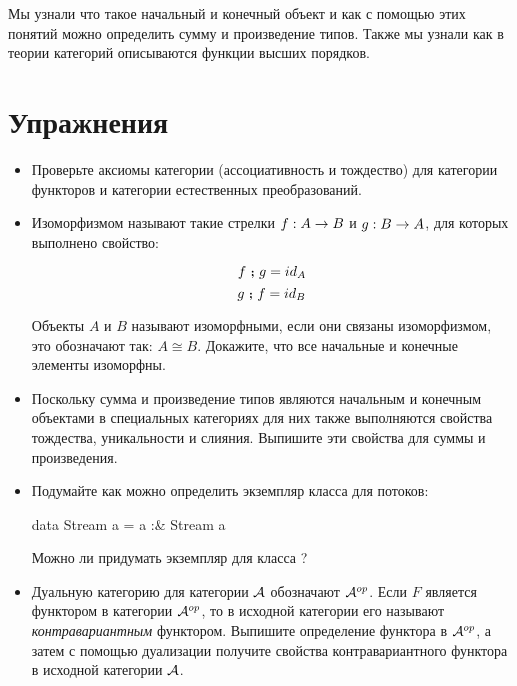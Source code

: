 Мы узнали что такое начальный и конечный объект и как
с помощью этих понятий можно определить сумму и произведение
типов. Также мы узнали как в теории категорий описываются
функции высших порядков.

\section{Упражнения}


\begin{itemize}
\item Проверьте аксиомы категории (ассоциативность и тождество)
    для категории функторов и категории естественных преобразований.

\item Изоморфизмом называют такие стрелки $f:A \rightarrow B$ и $g : B \rightarrow A$, для 
    которых выполнено свойство:

    \[ f \footnotesize\textbf{~;~}\normalsize g = id_A \]
    \[ g \footnotesize\textbf{~;~}\normalsize f = id_B \]

    Объекты $A$ и $B$ называют изоморфными, если они связаны
    изоморфизмом, это обозначают так: $A \cong B$. 
    Докажите, что все начальные и конечные элементы 
    изоморфны. 

\item Поскольку сумма и произведение типов являются 
    начальным и конечным объектами в специальных категориях
    для них также выполняются свойства тождества, уникальности и слияния.
    Выпишите эти свойства для суммы и произведения. 

\item Подумайте как можно определить экземпляр класса 
    для потоков:

\begin{code}
data Stream a = a :& Stream a
\end{code}

    Можно ли придумать экземпляр для класса ?

\item Дуальную категорию для категории $\mathcal{A}$ обозначают $\mathcal{A}^{op}$.
    Если $F$ является функтором в категории $\mathcal{A}^{op}$, то
    в исходной категории его называют \emph{контравариантным}
    функтором. Выпишите определение функтора в $\mathcal{A}^{op}$,
    а затем с помощью дуализации получите свойства контравариантного
    функтора в исходной категории $\mathcal{A}$.

\end{itemize}

\begin{code}
\end{code}

